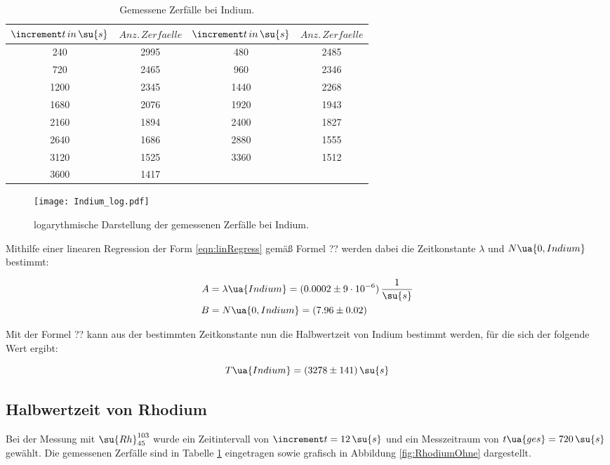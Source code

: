 \begin{table}
  \centering
  \caption{Gemessene Zerfälle bei Indium.}
  \label{tab:Indium}
  \begin{tabular}{c c c c}
    \toprule $\increment t \, in \, \su{s}$ & $Anz. \, Zerfaelle$ & $\increment t \, in \, \su{s}$ & $Anz. \, Zerfaelle$ \\
    \midrule
    240 & 2995  & 480  & 2485 \\
    720 & 2465  & 960  & 2346 \\
    1200 & 2345 & 1440 & 2268 \\
    1680 & 2076 & 1920 & 1943 \\
    2160 & 1894 & 2400 & 1827 \\
    2640 & 1686 & 2880 & 1555 \\
    3120 & 1525 & 3360 & 1512 \\
    3600 & 1417 &      &      \\
    \bottomrule
  \end{tabular}
\end{table}

\begin{figure}
  \texttt{[image: Indium\_log.pdf]}
  \caption{logarythmische Darstellung der gemessenen Zerfälle bei Indium.}
  \label{fig:Indium}
\end{figure}

Mithilfe einer linearen Regression der Form \eqref{eqn:linRegress} gemäß Formel
?? werden dabei die Zeitkonstante $\lambda$ und $N\ua{0,Indium}$ bestimmt:

\begin{align*}
A &= \lambda\ua{Indium} = (0.0002 \pm 9 \cdot 10^{-6}) \, \frac{1}{\su{s}}\\
B &= N\ua{0,Indium}     = (7.96 \pm 0.02)
\end{align*}

Mit der Formel ?? kann aus der bestimmten Zeitkonstante nun die Halbwertzeit von
Indium bestimmt werden, für die sich der folgende Wert ergibt:

\begin{equation*}
  T\ua{Indium} = (3278 \pm 141) \, \su{s}
\end{equation*}

\subsection{Halbwertzeit von Rhodium}

Bei der Messung mit $\su{Rh}_{45}^{103}$ wurde ein Zeitintervall von $\increment t = 12 \,
\su{s}$ und ein Messzeitraum von $t\ua{ges} = 720 \, \su{s}$ gewählt. Die gemessenen
Zerfälle sind in Tabelle \ref{tab:Indium} eingetragen sowie grafisch in Abbildung
\ref{fig:RhodiumOhne} dargestellt.

